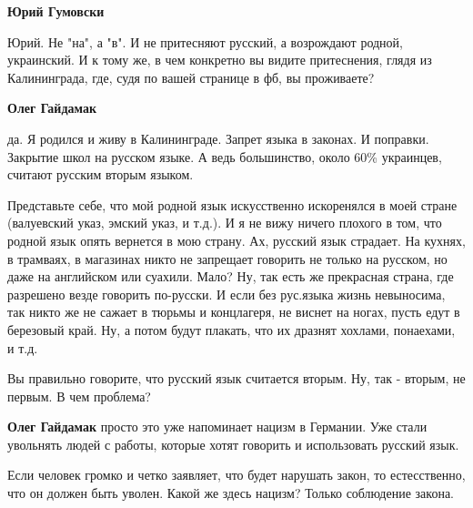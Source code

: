 \begin{itemize}
\begin{itemize}
\textbf{Юрий Гумовски} 

Юрий. Не "на", а "в". И не притесняют русский, а возрождают родной, украинский.
И к тому же, в чем конкретно вы видите притеснения, глядя из Калининграда, где,
судя по вашей странице в фб, вы проживаете?


\textbf{Олег Гайдамак} 

да. Я родился и живу в Калининграде. Запрет языка в
законах. И поправки. Закрытие школ на русском языке. А ведь большинство, около
60\% украинцев, считают русским вторым языком.



Представьте себе, что мой родной язык искусственно искоренялся в моей стране
(валуевский указ, эмский указ, и т.д.). И я не вижу ничего плохого в том, что
родной язык опять вернется в мою страну. Ах, русский язык страдает. На кухнях,
в трамваях, в магазинах никто не запрещает говорить не только на русском, но
даже на английском или суахили. Мало? Ну, так есть же прекрасная страна, где
разрешено везде говорить по-русски. И если без рус.языка жизнь невыносима, так
никто же не сажает в тюрьмы и концлагеря, не виснет на ногах, пусть едут в
березовый край. Ну, а потом будут плакать, что их дразнят хохлами, понаехами, и
т.д.

Вы правильно говорите, что русский язык считается вторым. Ну, так - вторым, не
первым. В чем проблема?




\textbf{Олег Гайдамак} просто это уже напоминает нацизм в Германии. Уже стали
увольнять людей с работы, которые хотят говорить и использовать русский язык.


Если человек громко и четко заявляет, что будет нарушать закон, то естесственно, что он должен быть уволен. Какой же здесь нацизм? Только соблюдение закона.



\end{itemize}
\end{itemize}
